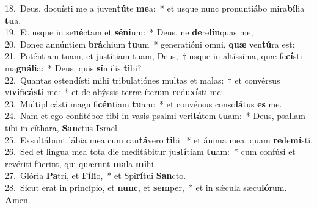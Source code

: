 {18.~}Deus, docuísti me a juven\textbf{tú}te \textbf{me}a:~* et usque nunc pronuntiábo mira\textbf{bí}lia \textbf{tu}a.\\
{19.~}Et usque in se\textbf{né}ctam et \textbf{sé}\textbf{ni}um:~* Deus, ne \textbf{de}re\textbf{lín}quas me,\\
{20.~}Donec annúntiem \textbf{brá}chium \textbf{tu}um~* generatióni omni, \textbf{quæ} ven\textbf{tú}ra est:\\
{21.~}Poténtiam tuam, et justítiam tuam, Deus,~† usque in altíssima, quæ fe\textbf{cí}sti ma\textbf{gná}\textbf{li}a:~* Deus, quis \textbf{sí}milis \textbf{ti}bi?\\
{22.~}Quantas ostendísti mihi tribulatiónes multas et malas:~† et convérsus vi\textbf{vi}fi\textbf{cá}\textbf{sti} me:~* et de abýssis terræ íterum \textbf{re}du\textbf{xí}sti me:\\
{23.~}Multiplicásti magnifi\textbf{cén}tiam \textbf{tu}am:~* et convérsus conso\textbf{lá}tus \textbf{es} me.\\
{24.~}Nam et ego confitébor tibi in vasis psalmi veri\textbf{tá}tem \textbf{tu}am:~* Deus, psallam tibi in cíthara, \textbf{San}ctus \textbf{Is}raël.\\
{25.~}Exsultábunt lábia mea cum can\textbf{tá}vero \textbf{ti}bi:~* et ánima mea, quam \textbf{re}de\textbf{mí}sti.\\
{26.~}Sed et lingua mea tota die meditábitur ju\textbf{stí}tiam \textbf{tu}am:~* cum confúsi et revériti fúerint, qui quærunt \textbf{ma}la \textbf{mi}hi.\\
{27.~}Glória \textbf{Pa}tri, et \textbf{Fí}\textbf{li}o,~* et Spi\textbf{rí}tui \textbf{San}cto.\\
{28.~}Sicut erat in princípio, et \textbf{nunc}, et \textbf{sem}per,~* et in sǽcula sæcu\textbf{ló}rum. \textbf{A}men.\\
